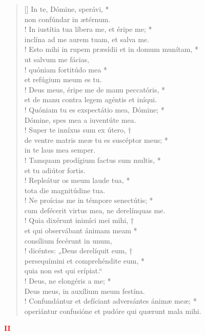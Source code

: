 \begin{verse}[\versewidth]
In te, Dómine, sperávi, *\\
non confúndar in ætérnum.\\!
\vin In iustítia tua líbera me, et éripe me; *\\
\vin inclína ad me aurem tuam, et salva me.\\!
Esto mihi in rupem præsídii et in domum munítam, *\\
ut salvum me fácias,\\!
\vin quóniam fortitúdo mea *\\
\vin et refúgium meum es tu.\\!
Deus meus, éripe me de manu peccatóris, *\\
et de manu contra legem agéntis et iníqui.\\!
\vin Quóniam tu es exspectátio mea, Dómine; *\\
\vin Dómine, spes mea a iuventúte mea.\\!
Super te inníxus sum ex útero, †\\
de ventre matris meæ tu es suscéptor meus; *\\
in te laus mea semper.\\!
\vin Tamquam prodígium factus sum multis, *\\
\vin et tu adiútor fortis.\\!
Repleátur os meum laude tua, *\\
tota die magnitúdine tua.\\!
\vin Ne proícias me in témpore senectútis; *\\
\vin cum defécerit virtus mea, ne derelínquas me.\\!
Quia dixérunt inimíci mei mihi, †\\
et qui observábant ánimam meam *\\
consílium fecérunt in unum,\\!
\vin dicéntes: „Deus derelíquit eum, †\\
\vin persequímini et comprehéndite eum, *\\
\vin quia non est qui erípiat.“\\!
Deus, ne elongéris a me; *\\
Deus meus, in auxílium meum festína.\\!
\vin Confundántur et defíciant adversántes ánimæ meæ; *\\
\vin operiántur confusióne et pudóre qui quærunt mala mihi.\\
\end{verse}
\begin{center}
\textcolor{red}{\bf II}
\end{center}
